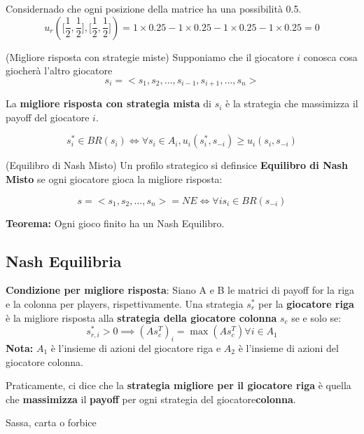 Considernado che ogni posizione della matrice ha una possibilità 0.5.
\[
    u_r(\big[\frac{1}{2}, \frac{1}{2}\big], \big[\frac{1}{2}, \frac{1}{2}\big]) = 1 \times 0.25 - 1 \times 0.25 - 1 \times 0.25 - 1 \times 0.25 = 0 \]

\begin{definition}(Migliore risposta con strategie miste)
    Supponiamo che il giocatore $i$ conosca cosa giocherà l'altro giocatore
    \[
        s_i = <s_1, s_2, \dots, s_{i-1}, s_{i+1}, \dots, s_n>
    \]

    La \textbf{migliore risposta con strategia mista} di $s_i$ è la strategia che
    massimizza il payoff del giocatore $i$.

    \[
        s_i^* \in BR(s_i) \iff \forall s_i \in A_i, u_i(s_i^*,s_{-i}) \geq u_i(s_i, s_{-i})
    \]
\end{definition}

\begin{definition}(Equilibro di Nash Misto)
    Un profilo strategico si definsice \textbf{Equilibro di Nash Misto} se ogni giocatore gioca la migliore risposta:

    \[
        s = <s_1, s_2, \dots, s_n> = NE \iff \forall i s_i \in BR(s_{-i})
    \]

    \textbf{Teorema:} Ogni gioco finito ha un Nash Equilibro.
\end{definition}

\subsection{Nash Equilibria}

\textbf{Condizione per migliore risposta}: Siano A e B le matrici di payoff for la riga e la colonna per players, rispettivamente.
Una strategia $s_r^*$ per la \textbf{giocatore riga} è la migliore risposta alla\textbf{ strategia della giocatore colonna} $s_c$ se e solo se:
\[
    s_{r,i}^* > 0 \implies (As_c^T)_i = \max(As_c^T) \forall i \in A_1
\]
\textbf{Nota:} $A_1$ è l'insieme di azioni del giocatore riga e $A_2$ è l'insieme di azioni del giocatore colonna.

Praticamente, ci dice che la \textbf{strategia migliore per il giocatore riga}
è quella che \textbf{massimizza} il \textbf{payoff} per ogni strategia del
giocatore\textbf{colonna}.

\begin{esempio} Sassa, carta o forbice
\end{esempio}


